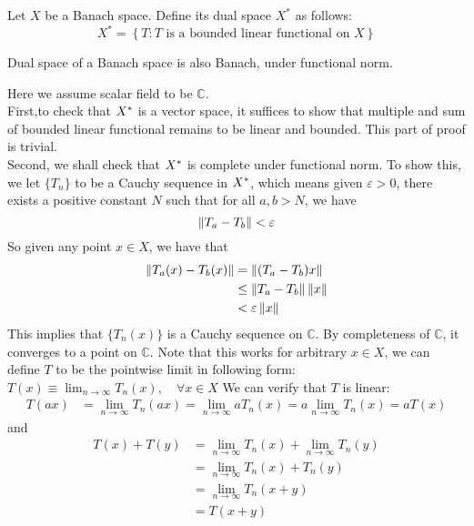 \begin{definition}\rm\nextline
	Let $X$ be a Banach space. Define its dual space $X^*$ as follows:
	$$
		X^*=\left\{
		T: T\text{ is a bounded linear functional on } X
		\right\}
	$$
\end{definition}
\begin{proposition}\label{dual space Banach}\rm\nextline
	Dual space of a Banach space is also Banach, under functional norm.\\
	\begin{pf}{}{}

	Here we assume scalar field to be $\mathbb{C}$.\\
	First,to check that ${X}^*$ is a vector space, it suffices to show that multiple and sum of bounded linear functional remains to be linear and bounded. This part of proof is trivial.\\
	Second, we shall check that ${X}^*$ is complete under functional norm.
	To show this, we let $\{T_n\}$ to be a Cauchy sequence in ${X}^*$, which means given $\varepsilon>0$, there exists a positive constant $N$ such that for all $a,b>N$, we have
	$$
		\left\|{T_a-T_b}\right\|<\varepsilon
	$$
	So given any point $x\in X$, we have that
	\begin{equation}
		\begin{split}
			\left\|{T_a(x)-T_b(x)}\right\|&=\left\|{(T_a-T_b)x}\right\|\\
			&\leq \left\|{T_a-T_b}\right\|\left\|{x}\right\|\\
			&<\varepsilon\left\|{x}\right\|
		\end{split}
	\end{equation}
	This implies that $\{T_n(x)\}$ is a Cauchy sequence on $\mathbb{C}$. By completeness of $\mathbb{C}$, it converges to a point on $\mathbb{C}$. Note that this works for arbitrary $x\in X$, we can define $T$ to be the pointwise limit in following form:
	$
		T(x)\equiv\lim_{n\to\infty}{T_n(x)},\quad\forall x\in X
	$
	We can verify that $T$ is linear:
	\begin{equation}
		\begin{split}
			T(ax)&=\lim_{n\to\infty}{T_n(ax)}
			=\lim_{n\to\infty}{aT_n(x)}
			=a\lim_{n\to\infty}{T_n(x)}
			=aT(x)
		\end{split}
	\end{equation}
and
	\begin{equation}
		\begin{split}
			T(x)+T(y)&=\lim_{n\to\infty}{T_n(x)}+\lim_{n\to\infty}{T_n(y)} \\
			&=\lim_{n\to\infty}{T_n(x)+T_n(y)}\\
			&=\lim_{n\to\infty}{T_n(x+y)}\\
			&=T(x+y)
		\end{split}
	\end{equation}


\end{pf}
\end{proposition}
